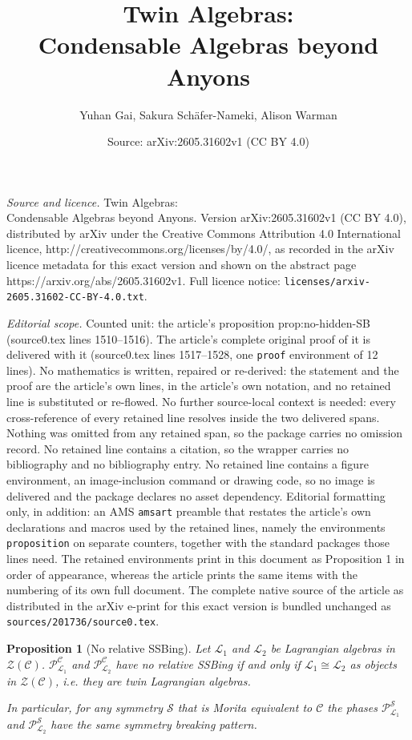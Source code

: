 \documentclass[10pt,a4paper]{amsart}
\title{Twin Algebras: \\ Condensable Algebras beyond Anyons}
\author{Yuhan Gai, Sakura Sch\"afer-Nameki, Alison Warman}
\date{Source: arXiv:2605.31602v1 (CC BY 4.0)}
\newtheorem{proposition}{Proposition}
\newcommand{\cC}{\mathcal{C}}
\newcommand{\cL}{\mathcal{L}}
\newcommand{\cP}{\mathcal{P}}
\newcommand{\cS}{\mathcal{S}}
\newcommand{\cZ}{\mathcal{Z}}
\begin{document}
\maketitle

\noindent\emph{Source and licence.} Twin Algebras: \\ Condensable Algebras beyond Anyons. Version arXiv:2605.31602v1 (CC BY 4.0), distributed by arXiv under the Creative Commons Attribution 4.0 International licence, http://creativecommons.org/licenses/by/4.0/, as recorded in the arXiv licence metadata for this exact version and shown on the abstract page https://arxiv.org/abs/2605.31602v1. Full licence notice: \texttt{licenses/arxiv-2605.31602-CC-BY-4.0.txt}.\par\smallskip

\noindent\textit{Editorial scope.} Counted unit: the article's proposition prop:no-hidden-SB (source0.tex lines 1510--1516). The article's complete original proof of it is delivered with it (source0.tex lines 1517--1528, one \texttt{proof} environment of 12 lines). No mathematics is written, repaired or re-derived: the statement and the proof are the article's own lines, in the article's own notation, and no retained line is substituted or re-flowed.  No further source-local context is needed: every cross-reference of every retained line resolves inside the two delivered spans.  Nothing was omitted from any retained span, so the package carries no omission record.  No retained line contains a citation, so the wrapper carries no bibliography and no bibliography entry.  No retained line contains a figure environment, an image-inclusion command or drawing code, so no image is delivered and the package declares no asset dependency.  Editorial formatting only, in addition: an AMS \texttt{amsart} preamble that restates the article's own declarations and macros used by the retained lines, namely the environments \texttt{proposition} on separate counters, together with the standard packages those lines need.  The retained environments print in this document as Proposition 1 in order of appearance, whereas the article prints the same items with the numbering of its own full document.  The complete native source of the article as distributed in the arXiv e-print for this exact version is bundled unchanged as \texttt{sources/201736/source0.tex}.
\begin{proposition}[No relative SSBing]
\label{prop:no-hidden-SB}
    Let $\cL_1$ and $\cL_2$ be Lagrangian algebras in $\cZ(\cC)$. $\cP^{\cC}_{\cL_1}$ and $\cP^{\cC}_{\cL_2}$ have no relative SSBing
    if and only if $\cL_1 \cong \cL_2$ as objects in $\cZ(\cC)$, i.e. they are twin Lagrangian algebras.
    
    In particular, for any symmetry $\cS$ that is Morita equivalent to $\cC$ the phases $\cP^{\cS}_{\cL_1}$ and $\cP^{\cS}_{\cL_2}$ have the same symmetry breaking pattern. 
\end{proposition}
\end{document}

